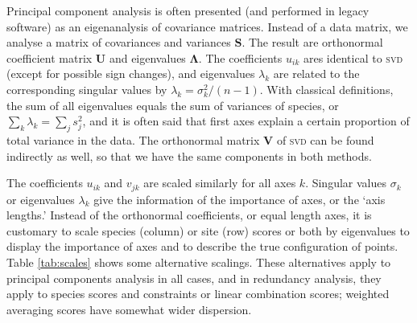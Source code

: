 \documentclass[article,nojss]{jss}
\begin{document}
Principal component analysis is often presented (and performed in
legacy software) as an eigenanalysis of covariance matrices.  Instead
of a data matrix, we analyse a matrix of covariances and variances
$\mathbf{S}$.  The result are orthonormal coefficient matrix
$\mathbf{U}$ and eigenvalues $\mathbf{\Lambda}$.  The coefficients
$u_{ik}$ ares identical to \textsc{svd} (except for possible sign
changes), and eigenvalues $\lambda_k$ are related to the corresponding
singular values by $\lambda_k = \sigma_k^2 /(n-1)$.  With classical
definitions, the sum of all eigenvalues equals the sum of variances of
species, or $\sum_k \lambda_k = \sum_j s_j^2$, and it is often said
that first axes explain a certain proportion of total variance in the
data.  The orthonormal matrix $\mathbf{V}$ of \textsc{svd} can be
found indirectly as well, so that we have the same components in both
methods.

The coefficients $u_{ik}$ and $v_{jk}$ are scaled similarly for all
axes $k$. Singular values $\sigma_k$ or eigenvalues $\lambda_k$ give
the information of the importance of axes, or the `axis lengths.'
Instead of the orthonormal coefficients, or equal length axes, it is
customary to scale species (column) or site (row) scores or both by
eigenvalues to display the importance of axes and to describe the true
configuration of points.  Table \ref{tab:scales} shows some
alternative scalings.  These alternatives apply to principal
components analysis in all cases, and in redundancy analysis, they
apply to species scores and constraints or linear combination scores;
weighted averaging scores have somewhat wider dispersion.
\end{document}

